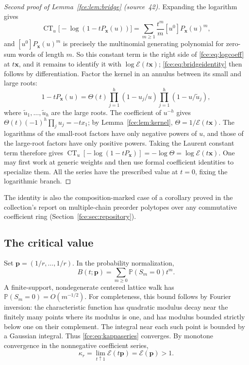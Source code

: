 \documentclass[11pt,a4paper]{article}
\numberwithin{equation}{section}
\theoremstyle{definition}\newtheorem{definition}[theorem]{Definition}
\theoremstyle{remark}\newtheorem{remark}[theorem]{Remark}
\newcommand{\ct}{\operatorname{CT}}
\newcommand{\E}{\mathcal E}
\newcommand{\Prob}{\mathbb P}
\begin{document}
\begin{proof}[Second proof of Lemma~\ref{fce:lem:bridge} (source~42)]
Expanding the logarithm gives
\[
 \ct_u\bigl[-\log(1-tP_{\boldsymbol x}(u))\bigr]
 =\sum_{m\ge1}\frac{t^m}{m}[u^0]P_{\boldsymbol x}(u)^m,
\]
and $[u^0]P_{\boldsymbol x}(u)^m$ is precisely the multinomial generating
polynomial for zero-sum words of length $m$. So this constant term is the
right side of \eqref{fce:eq:logcoeff} at $t\boldsymbol x$, and it remains
to identify it with $\log\E(t\boldsymbol x)$; \eqref{fce:eq:bridgeidentity}
then follows by differentiation. Factor the kernel in an annulus between
its small and large roots:
\[
 1-tP_{\boldsymbol x}(u)=\Theta(t)
 \prod_{j=1}^h(1-u_j/u)\prod_{j=1}^h(1-u/\tilde u_j),
\]
where $\tilde u_1,\ldots,\tilde u_h$ are the large roots. The coefficient of
$u^{-h}$ gives $\Theta(t)(-1)^h\prod_ju_j=-tx_1$; by
Lemma~\ref{fce:lem:kernel}, $\Theta=1/\E(t\boldsymbol x)$. The logarithms of
the small-root factors have only negative powers of $u$, and those of the
large-root factors have only positive powers. Taking the Laurent constant
term therefore gives
$\ct_u[-\log(1-tP_{\boldsymbol x})]=-\log\Theta=\log\E(t\boldsymbol x)$.
One may first work at generic weights and then use formal coefficient
identities to specialize them. All the series have the prescribed value at
$t=0$, fixing the logarithmic branch.
\end{proof}
The identity is also the composition-marked case of a corollary proved in
the collection's report on multiple-chain preorder polytopes over any
commutative coefficient ring (Section~\ref{fce:sec:repository}).

\subsection{The critical value}
Set $\boldsymbol p=(1/r,\ldots,1/r)$. In the probability normalization,
\[
 B(t;\boldsymbol p)=\sum_{m\ge0}\Prob(S_m=0)t^m.
\]
A finite-support, nondegenerate centered lattice walk has
$\Prob(S_m=0)=O(m^{-1/2})$. For completeness, this bound follows by Fourier
inversion: the characteristic function has quadratic modulus decay near
the finitely many points where its modulus is one, and has modulus bounded
strictly below one on their complement. The integral near each such point
is bounded by a Gaussian integral. Thus \eqref{fce:eq:kappaseries} converges.
By monotone convergence in the nonnegative coefficient series,
\begin{equation}\label{fce:eq:criticalvalue}
 \kappa_r=\lim_{t\uparrow1}\E(t\boldsymbol p)
 =\E(\boldsymbol p)>1.
\end{equation}
\end{document}
